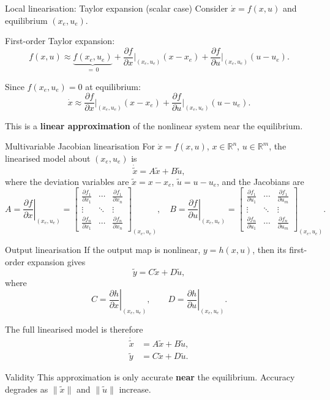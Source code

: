 \documentclass[aspectratio=169,10pt]{beamer}
\newcommand{\R}{\mathbb{R}}
\begin{document}
\begin{frame}{Local linearisation: Taylor expansion (scalar case)}
Consider $\dot{x}=f(x,u)$ and equilibrium $(x_e,u_e)$.

First-order Taylor expansion:
\[
f(x,u)\approx
\underbrace{f(x_e,u_e)}_{=\,0}
+\frac{\partial f}{\partial x}\Big|_{(x_e,u_e)}\!(x-x_e)
+\frac{\partial f}{\partial u}\Big|_{(x_e,u_e)}\!(u-u_e).
\]

Since $f(x_e,u_e)=0$ at equilibrium:
\[
\dot{x}\approx
\frac{\partial f}{\partial x}\Big|_{(x_e,u_e)}\!(x-x_e)
+
\frac{\partial f}{\partial u}\Big|_{(x_e,u_e)}\!(u-u_e).
\]

This is a \textbf{linear approximation} of the nonlinear system near the
equilibrium.
\end{frame}

\begin{frame}{Multivariable Jacobian linearisation}
For $\dot{x}=f(x,u)$, $x\in\R^n$, $u\in\R^m$, the linearised model about
$(x_e,u_e)$ is
\[
\dot{\tilde{x}}=A\tilde{x}+B\tilde{u},
\]
where the deviation variables are
$\tilde{x}=x-x_e$, $\tilde{u}=u-u_e$,
and the Jacobians are
\[
A=\left.\frac{\partial f}{\partial x}\right|_{(x_e,u_e)}
\!=\!
\begin{bmatrix}
\frac{\partial f_1}{\partial x_1} & \cdots &
\frac{\partial f_1}{\partial x_n}\\
\vdots & \ddots & \vdots\\
\frac{\partial f_n}{\partial x_1} & \cdots &
\frac{\partial f_n}{\partial x_n}
\end{bmatrix}_{(x_e,u_e)}\!\!\!,
\quad
B=\left.\frac{\partial f}{\partial u}\right|_{(x_e,u_e)}
\!=\!
\begin{bmatrix}
\frac{\partial f_1}{\partial u_1} & \cdots &
\frac{\partial f_1}{\partial u_m}\\
\vdots & \ddots & \vdots\\
\frac{\partial f_n}{\partial u_1} & \cdots &
\frac{\partial f_n}{\partial u_m}
\end{bmatrix}_{(x_e,u_e)}\!\!\!.
\]
\end{frame}

\begin{frame}{Output linearisation}
If the output map is nonlinear, $y=h(x,u)$, then its first-order expansion
gives
\[
\tilde{y}=C\tilde{x}+D\tilde{u},
\]
where
\[
C=\left.\frac{\partial h}{\partial x}\right|_{(x_e,u_e)},
\qquad
D=\left.\frac{\partial h}{\partial u}\right|_{(x_e,u_e)}.
\]

The full linearised model is therefore
\begin{align*}
\dot{\tilde{x}} &= A\tilde{x}+B\tilde{u},\\
\tilde{y} &= C\tilde{x}+D\tilde{u}.
\end{align*}

\begin{alertbox}{Validity}
This approximation is only accurate \textbf{near} the equilibrium.
Accuracy degrades as $\|\tilde{x}\|$ and $\|\tilde{u}\|$ increase.
\end{alertbox}
\end{frame}
\end{document}
